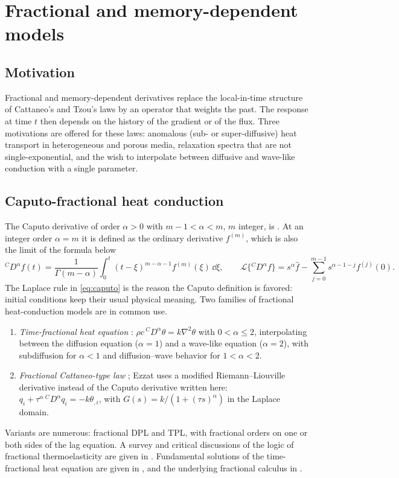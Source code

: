 \section{Fractional and memory-dependent models}\label{sec:memory}
\subsection{Motivation}
Fractional and memory-dependent derivatives replace the local-in-time structure of Cattaneo's and Tzou's laws by an operator that weights the past. The response at time $t$ then depends on the history of the gradient or of the flux. Three motivations are offered for these laws: anomalous (sub- or super-diffusive) heat transport in heterogeneous and porous media, relaxation spectra that are not single-exponential, and the wish to interpolate between diffusive and wave-like conduction with a single parameter.

\subsection{Caputo-fractional heat conduction}
The Caputo derivative of order $\alpha>0$ with $m-1<\alpha<m$, $m$ integer, is \citep{Caputo1967,Podlubny1999}. At an integer order $\alpha=m$ it is defined as the ordinary derivative $f^{(m)}$, which is also the limit of the formula below
\begin{equation}
{}^C\!D^\alpha f(t)=\frac1{\Gamma(m-\alpha)}\int_0^t(t-\xi)^{m-\alpha-1}f^{(m)}(\xi)\,\dd\xi,\qquad
\mathcal L\{{}^C\!D^\alpha f\}=s^\alpha\hat f-\sum_{j=0}^{m-1}s^{\alpha-1-j}f^{(j)}(0).\label{eq:caputo}
\end{equation}
The Laplace rule in \eqref{eq:caputo} is the reason the Caputo definition is favored: initial conditions keep their usual physical meaning. Two families of fractional heat-conduction models are in common use.
\begin{enumerate}
\item \emph{Time-fractional heat equation} \citep{Povstenko2004,Povstenko2007,Povstenko2009}: $\rho c\,{}^C\!D^\alpha\theta=k\nabla^2\theta$ with $0<\alpha\le2$, interpolating between the diffusion equation ($\alpha=1$) and a wave-like equation ($\alpha=2$), with subdiffusion for $\alpha<1$ and diffusion--wave behavior for $1<\alpha<2$.
\item \emph{Fractional Cattaneo-type law} \citep{Povstenko2011Cattaneo,Sherief2010Fractional}; Ezzat \citep{Ezzat2011} uses a modified Riemann--Liouville derivative instead of the Caputo derivative written here: $q_i+\tau^\alpha\,{}^C\!D^\alpha q_i=-k\theta_{,i}$, with $G(s)=k/(1+(\tau s)^\alpha)$ in the Laplace domain.
\end{enumerate}
Variants are numerous: fractional DPL and TPL, with fractional orders on one or both sides of the lag equation. A survey and critical discussions of the logic of fractional thermoelasticity are given in \citep{Povstenko2016,Yu2024,Povstenko2009}. Fundamental solutions of the time-fractional heat equation are given in \citep{Povstenko2004,Povstenko2007}, and the underlying fractional calculus in \citep{Gorenflo1997}.

